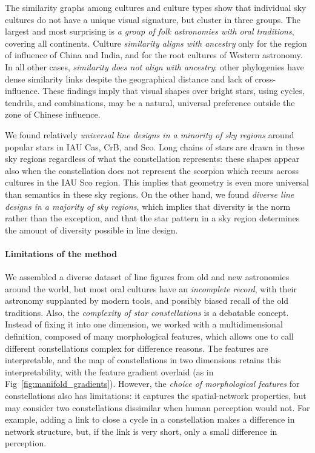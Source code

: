 \documentclass[10pt]{article}
\begin{document}
The similarity graphs among cultures and culture types show that individual sky cultures do not have a unique visual signature, but cluster in three groups. The largest and most surprising is \emph{a group of folk astronomies with oral traditions}, covering all continents. Culture \emph{similarity aligns with ancestry} only for the region of influence of China and India, and for the root cultures of Western astronomy. In all other cases, \emph{similarity does not align with ancestry}: other phylogenies have dense similarity links despite the geographical distance and lack of cross-influence. These findings imply that visual shapes over bright stars, using cycles, tendrils, and combinations, may be a natural, universal preference outside the zone of Chinese influence.

We found relatively \emph{universal line designs in a minority of sky regions} around popular stars in IAU Cas, CrB, and Sco. Long chains of stars are drawn in these sky regions regardless of what the constellation represents: these shapes appear also when the constellation does not represent the scorpion which recurs across cultures in the IAU Sco region. This implies that geometry is even more universal than semantics in these sky regions. On the other hand, we found \emph{diverse line designs in a majority of sky regions}, which implies that diversity is the norm rather than the exception, and that the star pattern in a sky region determines the amount of diversity possible in line design.

\paragraph{Limitations of the method} We assembled a diverse dataset of line figures from old and new astronomies around the world, but most oral cultures have an \emph{incomplete record}, with their astronomy supplanted by modern tools, and possibly biased recall of the old traditions. Also, the \emph{complexity of star constellations} is a debatable concept. Instead of fixing it into one dimension, we worked with a multidimensional definition, composed of many morphological features, which allows one to call different constellations complex for difference reasons. The features are interpretable, and the map of constellations in two dimensions retains this interpretability, with the feature gradient overlaid (as in Fig~\ref{fig:manifold_gradients}). However, the \emph{choice of morphological features} for constellations also has limitations: it captures the spatial-network properties, but may consider two constellations dissimilar when human perception would not. For example, adding a link to close a cycle in a constellation makes a difference in network structure, but, if the link is very short, only a small difference in perception.
\end{document}
